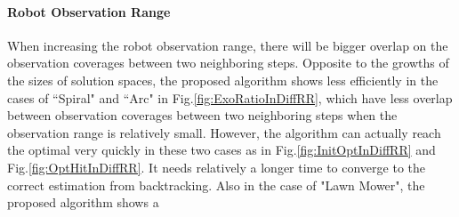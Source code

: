 \documentclass[12pt]{article}
\begin{document}
\paragraph{Robot Observation Range}

When increasing the robot observation range, there will be bigger overlap on the observation coverages between two neighboring steps. Opposite to the growths of the sizes of solution spaces, the proposed algorithm shows less efficiently in the cases of ``Spiral" and ``Arc" in Fig.\ref{fig:ExoRatioInDiffRR}, which have less overlap between observation coverages between two neighboring steps when the observation range is relatively small. However, the algorithm can actually reach the optimal very quickly in these two cases as in Fig.\ref{fig:InitOptInDiffRR} and Fig.\ref{fig:OptHitInDiffRR}. It needs relatively a longer time to converge to the correct estimation from backtracking. Also in the case of "Lawn Mower", the proposed algorithm shows a  
\end{document}
